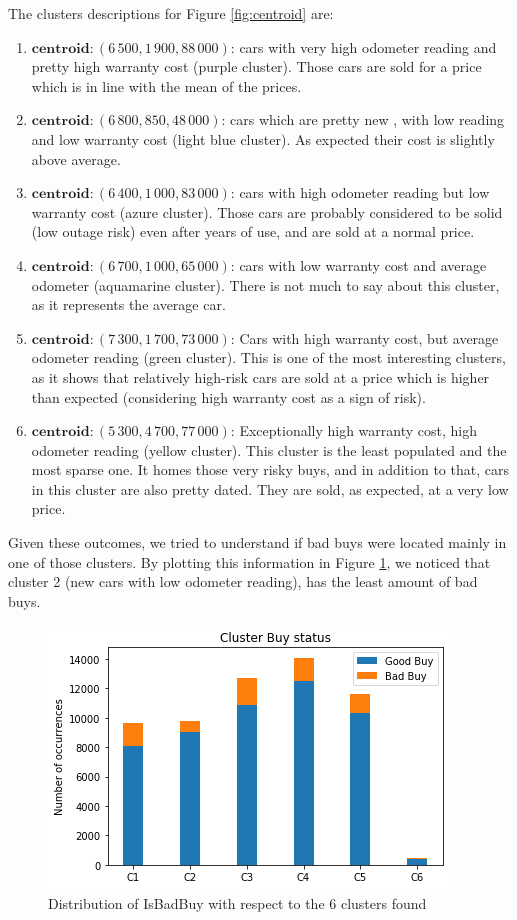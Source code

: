 \documentclass{article}
\begin{document}
	
	The clusters descriptions for Figure \ref{fig:centroid} are:
	\begin{enumerate}
		\item $\mathbf{centroid}: (6\,500,  1\,900,  88\,000)$: cars with very high odometer reading and pretty high warranty cost (purple cluster). Those cars are sold for a price which is in line with the mean of the prices.
		\item $\mathbf{centroid}: (6\,800,  850,  48\,000)$: cars which are pretty new , with low  reading and low warranty cost (light blue cluster). As expected their cost is slightly above average.
		\item $\mathbf{centroid}: (6\,400,  1\,000,  83\,000)$: cars with high odometer reading but low warranty cost (azure cluster). Those cars are probably considered to be solid (low outage risk) even after years of use, and are sold at a normal price.
		\item $\mathbf{centroid}: (6\,700,  1\,000,  65\,000)$: cars with low warranty cost and average odometer (aquamarine cluster). There is not much to say about this cluster, as it represents the average car.
		\item $\mathbf{centroid}: (7\,300,  1\,700,  73\,000)$: Cars with high warranty cost, but average odometer reading (green cluster). This is one of the most interesting clusters, as it shows that relatively high-risk cars are sold at a price which is higher than expected (considering high warranty cost as a sign of risk).
		\item $\mathbf{centroid}: (5\,300,  4\,700,  77\,000)$: Exceptionally high warranty cost, high odometer reading (yellow cluster). This cluster is the least populated and the most sparse one. It homes those very risky buys, and in addition to that, cars in this cluster are also pretty dated. They are sold, as expected, at a very low price. 
	\end{enumerate}
	Given these outcomes, we tried to understand if bad buys were located mainly in one of those clusters. By plotting this information in Figure \ref{fig:clusterbuy}, we noticed that cluster 2 (new cars with low odometer reading), has the least amount of bad buys.
	\begin{figure}[H]
		\centering
		\includegraphics[width=.4\textwidth, keepaspectratio]{clusterbuy}
		\caption{{Distribution of IsBadBuy with respect to the 6 clusters found}}
		\label{fig:clusterbuy}
	\end{figure}
	
\end{document}
